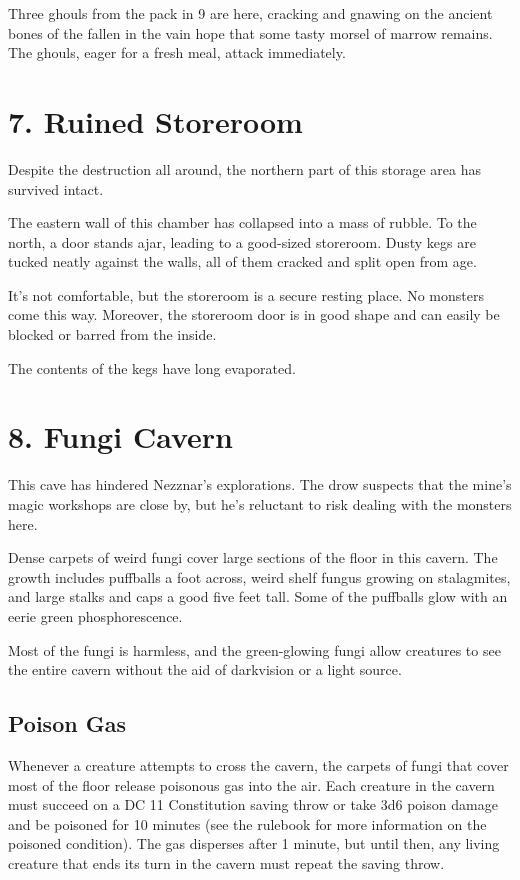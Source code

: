 \documentclass[10pt,a4paper,twoside,bg=print,twocolumn,openany,nodeprecatedcode]{dndbook}
\begin{document}
Three ghouls from the pack in 9 are here, cracking and gnawing on the ancient bones of the fallen in the vain hope that some tasty morsel of marrow remains. The ghouls, eager for a fresh meal, attack immediately.

\section{7. Ruined Storeroom}
Despite the destruction all around, the northern part of this storage area has survived intact.

\begin{DndReadAloud}{}
The eastern wall of this chamber has collapsed into a mass of rubble. To the north, a door stands ajar, leading to a good-sized storeroom. Dusty kegs are tucked neatly against the walls, all of them cracked and split open from age.

\end{DndReadAloud}

It's not comfortable, but the storeroom is a secure resting place. No monsters come this way. Moreover, the storeroom door is in good shape and can easily be blocked or barred from the inside.

The contents of the kegs have long evaporated.

\section{8. Fungi Cavern}
This cave has hindered Nezznar's explorations. The drow suspects that the mine's magic workshops are close by, but he's reluctant to risk dealing with the monsters here.

\begin{DndReadAloud}{}
Dense carpets of weird fungi cover large sections of the floor in this cavern. The growth includes puffballs a foot across, weird shelf fungus growing on stalagmites, and large stalks and caps a good five feet tall. Some of the puffballs glow with an eerie green phosphorescence.

\end{DndReadAloud}

Most of the fungi is harmless, and the green-glowing fungi allow creatures to see the entire cavern without the aid of darkvision or a light source.

\subsection{Poison Gas}
Whenever a creature attempts to cross the cavern, the carpets of fungi that cover most of the floor release poisonous gas into the air. Each creature in the cavern must succeed on a DC 11 Constitution saving throw or take 3d6 poison damage and be poisoned for 10 minutes (see the rulebook for more information on the poisoned condition). The gas disperses after 1 minute, but until then, any living creature that ends its turn in the cavern must repeat the saving throw.
\end{document}
